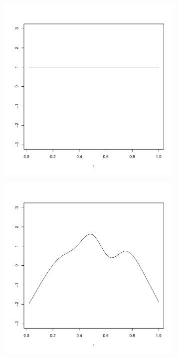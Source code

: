 \begin{figure} %
        \centering 
        \begin{subfigure}[b]{0.32\textwidth}
                \centering
                \includegraphics[width=0.99\textwidth]{Images-future-work/ef0.pdf}
                \caption{}
                \label{}
        \end{subfigure}%
        \begin{subfigure}[b]{0.32\textwidth}
                \centering
                \includegraphics[width=0.99\textwidth]{Images-future-work/ef1.pdf}

\end{subfigure}
\end{figure}
